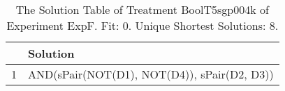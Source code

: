\begin{table}[ht]
\centering
\begin{tabular}{rp{9cm}}
  \hline
 & Solution \\ 
  \hline
1 & AND(sPair(NOT(D1), NOT(D4)), sPair(D2, D3)) \\ 
   \hline
\end{tabular}
\caption{The Solution Table of Treatment BoolT5sgp004k of Experiment ExpF. Fit: 0. Unique Shortest Solutions: 8.} 
\end{table}
